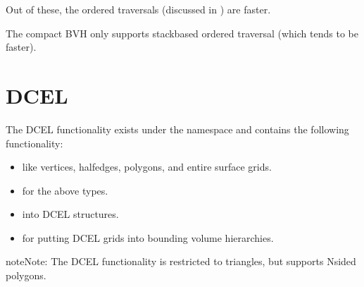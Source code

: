 \documentclass[letterpaper,10pt,english]{sphinxmanual}
\begin{document}
\sphinxAtStartPar
Out of these, the ordered traversals (discussed in {\hyperref[\detokenize{BVH:chap-bvh}]{}}) are faster.

\sphinxAtStartPar
The compact BVH only supports stack\sphinxhyphen{}based ordered traversal (which tends to be faster).

\sphinxstepscope


\section{DCEL}
\label{\detokenize{ImplemDCEL:dcel}}\label{\detokenize{ImplemDCEL:chap-implemdcel}}\label{\detokenize{ImplemDCEL::doc}}
\sphinxAtStartPar
The DCEL functionality exists under the namespace  and contains the following functionality:
\begin{itemize}
\item {} 
\sphinxAtStartPar
{} like vertices, half\sphinxhyphen{}edges, polygons, and entire surface grids.

\item {} 
\sphinxAtStartPar
{} for the above types.

\item {} 
\sphinxAtStartPar
{} into DCEL structures.

\item {} 
\sphinxAtStartPar
{} for putting DCEL grids into bounding volume hierarchies.

\end{itemize}

\begin{sphinxadmonition}{note}{Note:}
\sphinxAtStartPar
The DCEL functionality is  restricted to triangles, but supports N\sphinxhyphen{}sided polygons.
\end{sphinxadmonition}
\end{document}
